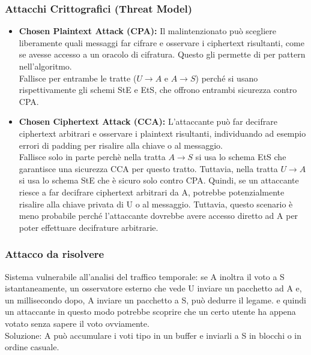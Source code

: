\subsubsection{Attacchi Crittografici (Threat Model)}
\begin{itemize}
	\item \textbf{Chosen Plaintext Attack (CPA):} 
	Il malintenzionato può scegliere liberamente quali messaggi far cifrare e osservare i ciphertext risultanti, come se avesse accesso a un oracolo di cifratura. Questo gli permette di per pattern nell'algoritmo.\\
	Fallisce per entrambe le tratte ($U \to A$ e $A \to S$) perché si usano rispettivamente gli schemi StE e EtS, che offrono entrambi sicurezza contro CPA.
	\item \textbf{Chosen Ciphertext Attack (CCA):}
	L'attaccante può far decifrare ciphertext arbitrari e osservare i plaintext risultanti, individuando ad esempio errori di padding per risalire alla chiave o al messaggio.\\
	Fallisce solo in parte perchè nella tratta $A \to S$ si usa lo schema EtS che garantisce una sicurezza CCA per questo tratto. Tuttavia, nella tratta $U \to A$ si usa lo schema StE che è sicuro solo contro CPA. Quindi, se un attaccante riesce a far decifrare ciphertext arbitrari da A, potrebbe potenzialmente risalire alla chiave privata di U o al messaggio. Tuttavia, questo scenario è meno probabile perché l'attaccante dovrebbe avere accesso diretto ad A per poter effettuare decifrature arbitrarie.
\end{itemize}


\subsubsection{Attacco da risolvere}
Sistema vulnerabile all'analisi del traffico temporale: se A inoltra il voto a S istantaneamente, un osservatore esterno che vede U inviare un pacchetto ad A e, un millisecondo dopo, A inviare un pacchetto a S, può dedurre il legame. e quindi un attaccante in questo modo potrebbe scoprire che un certo utente ha appena votato senza sapere il voto ovviamente.\\
Soluzione: A può accumulare i voti tipo in un buffer e inviarli a S in blocchi o in ordine casuale.